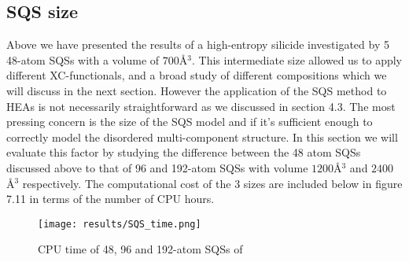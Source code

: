 \subsection{SQS size}
Above we have presented the results of a high-entropy silicide  investigated by 5 48-atom SQSs with a volume of $700$\r{A}$^3$. This intermediate size allowed us to apply different XC-functionals, and a broad study of different compositions which we will discuss in the next section. However the application of the SQS method to HEAs is not necessarily straightforward as we discussed in section 4.3. The most pressing concern is the size of the SQS model and if it's sufficient enough to correctly model the disordered multi-component structure. In this section we will evaluate this factor by studying the difference between the 48 atom SQSs discussed above to that of 96 and 192-atom SQSs with volume $1200$\r{A}$^3$ and $2400$ \r{A}$^3$ respectively. The computational cost of the 3 sizes are included below in figure 7.11 in terms of the number of CPU hours.

\begin{figure}[H]
\centering
\texttt{[image: results/SQS\_time.png]}
\caption{CPU time of 48, 96 and 192-atom SQSs of }
\end{figure}

